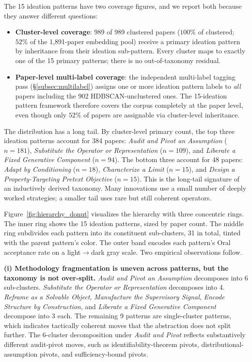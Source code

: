 \documentclass[10pt,a4paper]{article}
\begin{document}
The 15 ideation patterns have two coverage figures, and we report both because they answer different questions:
\begin{itemize}[leftmargin=1.4em, topsep=2pt, itemsep=2pt]
\item \textbf{Cluster-level coverage}: 989 of 989 clustered papers ($100\%$ of clustered; $52\%$ of the 1{,}891-paper embedding pool) receive a primary ideation pattern by inheritance from their ideation sub-pattern. Every cluster maps to exactly one of the 15 primary patterns; there is no out-of-taxonomy residual.
\item \textbf{Paper-level multi-label coverage}: the independent multi-label tagging pass (\S\ref{subsec:multilabel}) assigns one or more ideation pattern labels to \emph{all} papers including the $902$ HDBSCAN-unclustered ones. The 15-ideation pattern framework therefore covers the corpus completely at the paper level, even though only $52\%$ of papers are assignable via cluster-level inheritance.
\end{itemize}
The distribution has a long tail. By cluster-level primary count, the top three ideation patterns account for 384 papers: \emph{Audit and Pivot an Assumption} ($n{=}181$), \emph{Substitute the Operator or Representation} ($n{=}109$), and \emph{Liberate a Fixed Generative Component} ($n{=}94$). The bottom three account for 48 papers: \emph{Adapt by Conditioning} ($n{=}18$), \emph{Characterize a Limit} ($n{=}15$), and \emph{Design a Property-Targeting Pretext Objective} ($n{=}15$). This is the long-tail signature of an inductively derived taxonomy. Many innovations use a small number of deeply worked strategies; a smaller tail uses rare but still coherent operators.

Figure~\ref{fig:hierarchy_donut} visualizes the hierarchy with three concentric rings. The inner ring shows the 15 ideation patterns, sized by paper count. The middle ring subdivides each pattern into its constituent sub-clusters, 31 in total, tinted with the parent pattern's color. The outer band encodes each pattern's Oral acceptance rate on a light$\rightarrow$dark gray scale. Two empirical observations follow.

\textbf{(i) Methodology fragmentation is uneven across patterns, but the taxonomy is not over-split.} \emph{Audit and Pivot an Assumption} decomposes into 6 sub-clusters. \emph{Substitute the Operator or Representation} decomposes into 4. \emph{Reframe as a Solvable Object}, \emph{Manufacture the Supervisory Signal}, \emph{Encode Structure by Construction}, and \emph{Liberate a Fixed Generative Component} decompose into 3 each. The remaining 9 patterns are single-cluster patterns, which indicates tactically coherent moves that the abstraction does not split further. The 6-cluster decomposition under \emph{Audit and Pivot} reflects substantively different audit-pivot moves, such as identifiability-theorem pivots, distributional-assumption pivots, and sufficiency-bound pivots.
\end{document}
